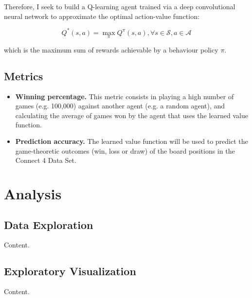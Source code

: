 \documentclass{article}
\begin{document}
Therefore, I seek to build a Q-learning agent trained via a deep convolutional neural network to
approximate the optimal action-value function:

\begin{equation}
Q^*(s,a) = \max\limits_\pi Q^\pi(s,a), \forall s \in \mathcal{S}, a \in \mathcal{A}
\end{equation}

\noindent which is the maximum sum of rewards achievable by a behaviour policy $\pi$.

\subsection{Metrics}

\begin{itemize}

    \item \textbf{Winning percentage.} This metric consists in playing a high number of games (e.g.
        100,000) against another agent (e.g. a random agent), and calculating the average of games
        won by the agent that uses the learned value function.
        
    \item \textbf{Prediction accuracy.} The learned value function will be used to predict the
        game-theoretic outcomes (win, loss or draw) of the board positions in the Connect 4 Data
        Set.

\end{itemize}

\section{Analysis}

\subsection{Data Exploration}

Content.

\subsection{Exploratory Visualization}

Content.
\end{document}
